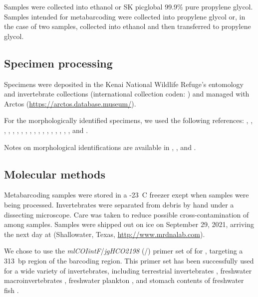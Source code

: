 \begin{multicols}{2}
Samples were collected into ethanol or SK picglobal 99.9\% pure propylene glycol. Samples intended for metabarcoding were collected into propylene glycol or, in the case of two samples, collected into ethanol and then transferred to propylene glycol.

\subsection{Specimen processing}

Specimens were deposited in the Kenai National Wildlife Refuge's entomology and invertebrate collections (international collection coden: ) and managed with Arctos (\url{https://arctos.database.museum/}).

For the morphologically identified specimens, we used the following references: \cite{Borroretal1989}, \cite{Brooks1957}, \cite{Burch1982}, \cite{Collet2008}, \cite{Durfee2005}, \cite{Haneyetal2013}, \cite{Hatch1953}, \cite{Herrington1962}, \cite{Kenner2009}, \cite{Mackie2007}, \cite{Marx1957}, \cite{MerrittCummins1996}, \cite{Merrittetal2008}, \cite{Reid1987}, \cite{Rileyetal2002}, \cite{Roughley2000}, \cite{Walker1953}, \cite{Wallis1933}, and \cite{White1983}.

Notes on morphological identifications are available in \citet{Artaiz2021}, \citet{Bowser2022b}, and \citet{Bowser2022d}.

\subsection{Molecular methods}

Metabarcoding samples were stored in a -23~\textdegree{}C freezer exept when samples were being processed. Invertebrates were separated from debris by hand under a dissecting microscope. Care was taken to reduce possible cross-contamination of  among samples. Samples were shipped out on ice on September 29, 2021, arriving the next day at  (Shallowater, Texas, \url{http://www.mrdnalab.com}).

We chose to use the \textit{mlCOIintF}/\textit{jgHCO2198} (\-/\-) primer set of \citet{Lerayetal2013} for , targeting a 313~bp region of the   barcoding region. This primer set has been successfully used for a wide variety of invertebrates, including terrestrial invertebrates \citep{Bowseretal2020}, freshwater macroinvertebrates \citep{Hajibabaeietal2019}, freshwater plankton \citep{Yangetal2017}, and stomach contents of freshwater fish \citep{BowserBowser2020}.


\end{multicols}
